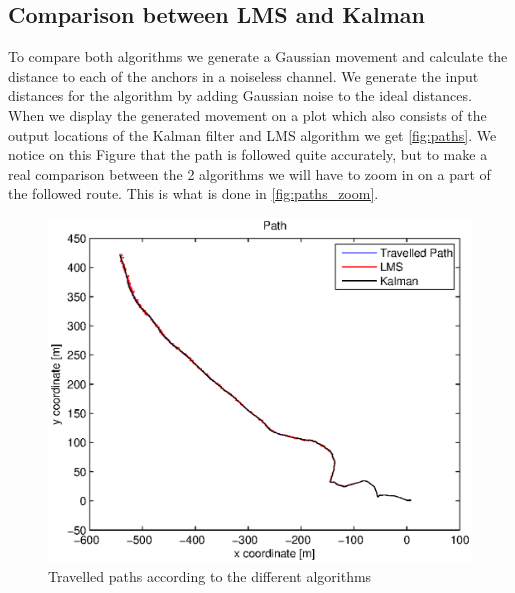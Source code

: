 \documentclass[a4paper]{article}        %
\begin{document}
\subsection{Comparison between LMS and Kalman}

To compare both algorithms we generate a Gaussian movement and calculate the distance to each of the anchors in a noiseless channel. We generate the input distances for the algorithm by adding Gaussian noise to the ideal distances.
When we display the generated movement on a plot which also consists of the output locations of the Kalman filter and LMS algorithm we get \autoref{fig:paths}.
We notice on this Figure that the path is followed quite accurately, but to make a real comparison between the 2 algorithms we will have to zoom in on a part of the followed route. This is what is done in \autoref{fig:paths_zoom}.	

			\begin{figure}[H]
				\centering
				\includegraphics[width=\textwidth]{images/tracking_algorithms.eps}
				\caption{Travelled paths according to the different algorithms}
				\label{fig:paths}
			\end{figure}

		
			
\end{document}
